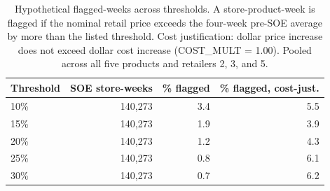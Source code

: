 \begin{table}[!h]
\centering
\caption{\label{tab:tab:flagged_weeks_all}Hypothetical flagged-weeks across thresholds. A store-product-week is flagged if the nominal retail price exceeds the four-week pre-SOE average by more than the listed threshold. Cost justification: dollar price increase does not exceed dollar cost increase (COST\_MULT = 1.00). Pooled across all five products and retailers 2, 3, and 5.}
\centering
\begin{tabular}[t]{lrrr}
\toprule
Threshold & SOE store-weeks & \% flagged & \% flagged, cost-just.\\
\midrule
10\% & 140,273 & 3.4 & 5.5\\
15\% & 140,273 & 1.9 & 3.9\\
20\% & 140,273 & 1.2 & 4.3\\
25\% & 140,273 & 0.8 & 6.1\\
30\% & 140,273 & 0.7 & 6.2\\
\bottomrule
\end{tabular}
\end{table}

